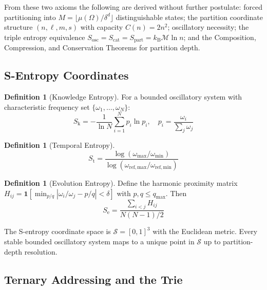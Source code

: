 \documentclass[11pt,twocolumn,a4paper]{article}
\theoremstyle{definition}
\newtheorem{definition}[theorem]{Definition}
\theoremstyle{remark}
\newcommand{\kB}{k_{\mathrm{B}}}
\newcommand{\Sk}{S_{\mathrm{k}}}
\newcommand{\St}{S_{\mathrm{t}}}
\newcommand{\Se}{S_{\mathrm{e}}}
\newcommand{\Sspace}{\mathcal{S}}
\newcommand{\Depth}{\mathcal{M}}
\begin{document}
From these two axioms the following are derived without further postulate: forced partitioning into $M = \lfloor \mu(\Omega)/\delta^d \rfloor$ distinguishable states; the partition coordinate structure $(n, \ell, m, s)$ with capacity $C(n) = 2n^2$; oscillatory necessity; the triple entropy equivalence $S_{\mathrm{osc}} = S_{\mathrm{cat}} = S_{\mathrm{part}} = \kB \Depth \ln n$; and the Composition, Compression, and Conservation Theorems for partition depth.

\subsection{S-Entropy Coordinates}

\begin{definition}[Knowledge Entropy]
\label{def:sk}
For a bounded oscillatory system with characteristic frequency set $\{\omega_1,\ldots,\omega_N\}$:
\begin{equation}
\Sk = -\frac{1}{\ln N} \sum_{i=1}^{N} p_i \ln p_i, \quad p_i = \frac{\omega_i}{\sum_j \omega_j}
\end{equation}
\end{definition}

\begin{definition}[Temporal Entropy]
\label{def:st}
\begin{equation}
\St = \frac{\log(\omega_{\max}/\omega_{\min})}{\log(\omega_{\mathrm{ref,max}}/\omega_{\mathrm{ref,min}})}
\end{equation}
\end{definition}

\begin{definition}[Evolution Entropy]
\label{def:se}
Define the harmonic proximity matrix $H_{ij} = \mathbf{1}[\min_{p/q} |\omega_i/\omega_j - p/q| < \delta]$ with $p, q \leq q_{\max}$. Then
\begin{equation}
\Se = \frac{\sum_{i<j} H_{ij}}{N(N-1)/2}
\end{equation}
\end{definition}

The S-entropy coordinate space is $\Sspace = [0,1]^3$ with the Euclidean metric. Every stable bounded oscillatory system maps to a unique point in $\Sspace$ up to partition-depth resolution.

\subsection{Ternary Addressing and the Trie}
\end{document}
